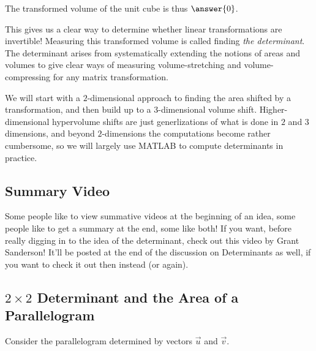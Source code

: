 \documentclass{ximera}
\begin{document}
The transformed volume of the unit cube is thus $\answer{0}$.

This gives us a clear way to determine whether linear transformations are invertible! Measuring this transformed volume is called finding \emph{the determinant}. The determinant arises from systematically extending the notions of areas and volumes to give clear ways of measuring volume-stretching and volume-compressing for any matrix transformation.

We will start with a $2$-dimensional approach to finding the area shifted by a transformation, and then build up to a $3$-dimensional volume shift. Higher-dimensional hypervolume shifts are just generlizations of what is done in $2$ and $3$ dimensions, and beyond $2$-dimensions the computations become rather cumbersome, so we will largely use MATLAB to compute determinants in practice. 

  \subsection*{Summary Video}
  Some people like to view summative videos at the beginning of an idea, some people like to get a summary at the end, some like both! If you want, before really digging in to the idea of the determinant, check out this video by Grant Sanderson! It'll be posted at the end of the discussion on Determinants as well, if you want to check it out then instead (or again).

  \begin{center}
\end{center}

    \subsection*{$2\times 2$ Determinant and the Area of a Parallelogram}
     
    Consider the parallelogram determined by vectors $\vec{u}$ and $\vec{v}$.
     
    \begin{center}
    \end{center}
\end{document}
